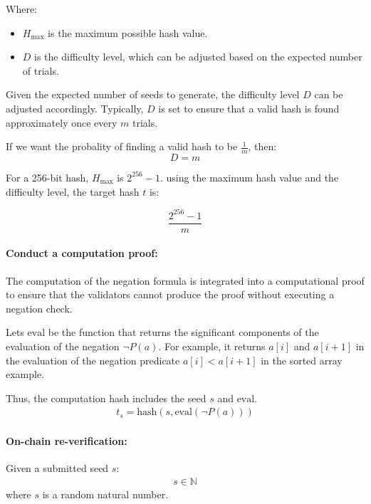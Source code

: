 \documentclass[runningheads]{llncs}
\begin{document}
Where:
\begin{itemize}
  \item \( H_{\text{max}} \) is the maximum possible hash value.
  \item \( D \) is the difficulty level, which can be adjusted based on the expected number of trials.
\end{itemize}


Given the expected number of seeds to generate, 
the difficulty level $D$ can be adjusted accordingly. Typically, $D$ is set to ensure that a valid hash is found approximately once every $m$ trials.

If we want the probality of finding a valid hash to be $\frac{1}{m}$, then:
\[
D=m
\]

For a 256-bit hash, $H_{\text{max}}$ is $2^{256} - 1 $.  using the maximum hash value and the difficulty level, the target hash $t$ is:
    
\[
\frac{2^{256} - 1}{m}
\]
\paragraph{Conduct a computation proof:} The computation of the negation formula is integrated into a computational proof to ensure that the validators cannot produce the proof without executing a negation check.

Lets \(\text{eval}\) be the function that returns the significant components of the evaluation of the negation \(\neg P(a)\).  For example, it returns \(a[i]\) and \(a[i + 1]\) in the evaluation of the negation predicate \(a[i] < a[i+1]\) in the sorted array example.

Thus, the computation hash includes the seed  \( s \) and \(\text{eval}\). 
\begin{align}
t_s = \text{hash}(s, \text{eval}(\neg P(a)))
\end{align}
\paragraph{On-chain re-verification:}
Given a submitted seed $s$: 
\begin{align}
s \in \mathbb{N} 
\end{align}
where $s$ is a random natural number.
\end{document}
